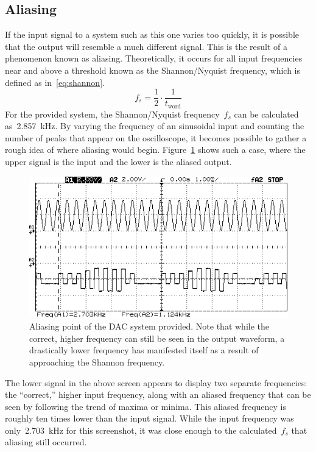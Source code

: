 \subsection{Aliasing}
If the input signal to a system such as this one varies too quickly, it is possible that the output will resemble a much different signal.  This is the result of a phenomenon known as aliasing.  Theoretically, it occurs for all input frequencies near and above a threshold known as the Shannon/Nyquist frequency, which is defined as in~\eqref{eq:shannon}.
%
\begin{equation}
	f_s = \frac{1}{2} \cdot \frac{1}{t_\text{word}} \label{eq:shannon}
\end{equation}
%
For the provided system, the Shannon/Nyquist frequency~$f_s$ can be calculated as~\SI{2.857}{\kilo\hertz}.  By varying the frequency of an sinusoidal input and counting the number of peaks that appear on the oscilloscope, it becomes possible to gather a rough idea of where aliasing would begin.  Figure~\ref{fig:pt7} shows such a case, where the upper signal is the input and the lower is the aliased output.
%
\begin{figure}[H]
	\centering
	\includegraphics[width=.6\textwidth]{img/shot/pt7_aliased.png}
	\parbox{.6\textwidth}{
	\caption[Aliasing]{Aliasing point of the DAC system provided.  Note that while the correct, higher frequency can still be seen in the output waveform, a drastically lower frequency has manifested itself as a result of approaching the Shannon frequency.}
	\label{fig:pt7}}
\end{figure}
%
The lower signal in the above screen appears to display two separate frequencies: the ``correct,'' higher input frequency, along with an aliased frequency that can be seen by following the trend of maxima or minima.  This aliased frequency is roughly ten times lower than the input signal.  While the input frequency was only~\SI{2.703}{\kilo\hertz} for this screenshot, it was close enough to the calculated~$f_s$ that aliasing still occurred.
